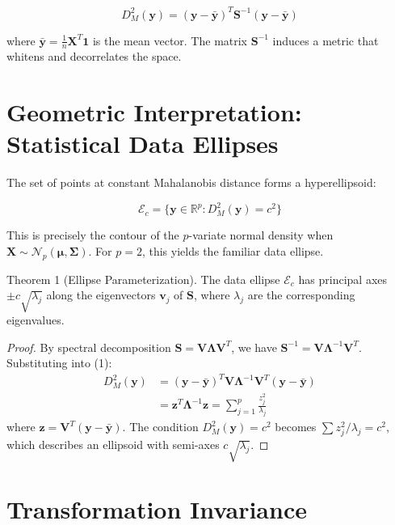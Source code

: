 \documentclass{article}
\begin{document}
\begin{equation}
    D_M^2(\mathbf{y}) = (\mathbf{y} - \bar{\mathbf{y}})^T \mathbf{S}^{-1} (\mathbf{y} - \bar{\mathbf{y}})
\end{equation}

where $\bar{\mathbf{y}} = \frac{1}{n}\mathbf{X}^T\mathbf{1}$ is the mean vector. The matrix $\mathbf{S}^{-1}$ induces a metric that whitens and decorrelates the space.

\section*{Geometric Interpretation: Statistical Data Ellipses}

The set of points at constant Mahalanobis distance forms a hyperellipsoid:

\begin{equation}
    \mathcal{E}_c = \{\mathbf{y} \in \mathbb{R}^p : D_M^2(\mathbf{y}) = c^2\}
\end{equation}

This is precisely the contour of the $p$-variate normal density when $\mathbf{X} \sim \mathcal{N}_p(\boldsymbol{\mu}, \mathbf{\Sigma})$. For $p=2$, this yields the familiar data ellipse.

Theorem 1 (Ellipse Parameterization).
The data ellipse $\mathcal{E}_c$ has principal axes $\pm c\sqrt{\lambda_j}$ along the eigenvectors $\mathbf{v}_j$ of $\mathbf{S}$, where $\lambda_j$ are the corresponding eigenvalues.

\begin{proof}
By spectral decomposition $\mathbf{S} = \mathbf{V}\boldsymbol{\Lambda}\mathbf{V}^T$, we have $\mathbf{S}^{-1} = \mathbf{V}\boldsymbol{\Lambda}^{-1}\mathbf{V}^T$. Substituting into (1):
\begin{align*}
    D_M^2(\mathbf{y}) &= (\mathbf{y} - \bar{\mathbf{y}})^T \mathbf{V}\boldsymbol{\Lambda}^{-1}\mathbf{V}^T (\mathbf{y} - \bar{\mathbf{y}}) \\
    &= \mathbf{z}^T \boldsymbol{\Lambda}^{-1} \mathbf{z} = \sum_{j=1}^p \frac{z_j^2}{\lambda_j}
\end{align*}
where $\mathbf{z} = \mathbf{V}^T(\mathbf{y} - \bar{\mathbf{y}})$. The condition $D_M^2(\mathbf{y}) = c^2$ becomes $\sum z_j^2/\lambda_j = c^2$, which describes an ellipsoid with semi-axes $c\sqrt{\lambda_j}$.
\end{proof}

\section*{Transformation Invariance}
\end{document}
